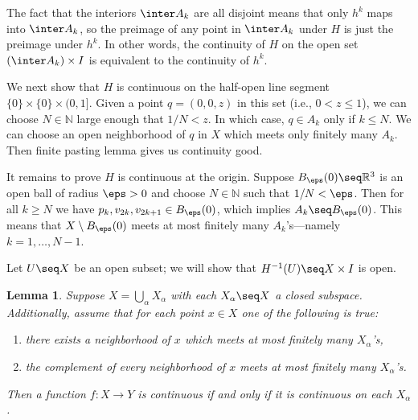 \documentclass[12pt]{article}
\newtheorem{lemma}{Lemma}
\newcommand{\N}{\mathbb{N}}
\newcommand{\R}{\mathbb{R}}
\begin{document}
    The fact that the interiors $\inter A_k$ are all disjoint means that only $h^k$ maps into $\inter A_k$, so the preimage of any point in $\inter A_k$ under $H$ is just the preimage under $h^k$.
    In other words, the continuity of $H$ on the open set $(\inter A_k) \times I$ is equivalent to the continuity of $h^k$.
    
    We next show that $H$ is continuous on the half-open line segment $\{0\} \times \{0\} \times (0, 1]$.
    Given a point $q = (0, 0, z)$ in this set (i.e., $0 < z \leq 1$), we can choose $N \in \N$ large enough that $1/N < z$.
    In which case, $q \in A_k$ only if $k \leq N$.
    We can choose an open neighborhood of $q$ in $X$ which meets only finitely many $A_k$.
    Then finite pasting lemma gives us continuity good.

    It remains to prove $H$ is continuous at the origin.
    Suppose $B_\eps(0) \seq \R^3$ is an open ball of radius $\eps > 0$ and choose $N \in \N$ such that $1/N < \eps$.
    Then for all $k \geq N$ we have $p_k, v_{2k}, v_{2k+1} \in B_\eps(0)$, which implies $A_k \seq B_\eps(0)$.
    This means that $X \setminus B_\eps(0)$ meets at most finitely many $A_k$'s---namely $k = 1, \dots, N-1$.

    Let $U \seq X$ be an open subset; we will show that $H^{-1}(U) \seq X \times I$ is open.


\begin{lemma}
    Suppose $X = \bigcup_\alpha X_\alpha$ with each $X_\alpha \seq X$ a closed subspace.
    Additionally, assume that for each point $x \in X$ one of the following is true:
    \begin{enumerate}
        \item[(i)] there exists a neighborhood of $x$ which meets at most finitely many $X_\alpha$'s,
        \item[(ii)] the complement of every neighborhood of $x$ meets at most finitely many $X_\alpha$'s.
    \end{enumerate}
    Then a function $f : X \to Y$ is continuous if and only if it is continuous on each $X_\alpha$.
\end{lemma}
\end{document}
